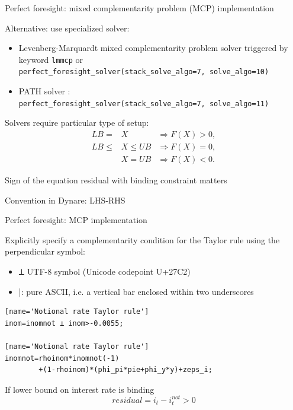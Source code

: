 \begin{frame}[fragile]{Perfect foresight: mixed complementarity problem (MCP) implementation}
\begin{wideitemize}
\item Alternative: use specialized  solver:
\begin{itemize}
\item Levenberg-Marquardt mixed complementarity problem solver \parencite{KanzowPetra2004} triggered by keyword \texttt{lmmcp} or\\
     \texttt{perfect\_foresight\_solver(stack\_solve\_algo=7, solve\_algo=10)}
\item PATH solver \parencite{FerrisMunson1999}: \\ \texttt{perfect\_foresight\_solver(stack\_solve\_algo=7, solve\_algo=11)}
\end{itemize}
\item Solvers require particular type of setup:
\begin{align}
        LB =&X  &\Rightarrow   F(X)>0,\\
       LB\leq &X \leq UB &\Rightarrow   F(X)=0,\\
        &X =UB &\Rightarrow   F(X)<0.
\end{align}
\item Sign of the equation residual with binding constraint matters
\item Convention in Dynare: LHS-RHS
\end{wideitemize}
\end{frame}

\begin{frame}[fragile]{Perfect foresight: MCP implementation}
\begin{wideitemize}
\item Explicitly specify a complementarity condition for the Taylor rule using the perpendicular symbol:
\begin{itemize}
        \item  ⟂ UTF-8 symbol (Unicode codepoint U+27C2)
        \item  \textunderscore|\textunderscore : pure ASCII, i.e. a vertical bar enclosed within two underscores
\end{itemize}
\begin{verbatim}
[name='Notional rate Taylor rule'] 
inom=inomnot ⟂ inom>-0.0055;

[name='Notional rate Taylor rule']
inomnot=rhoinom*inomnot(-1)
        +(1-rhoinom)*(phi_pi*pie+phi_y*y)+zeps_i;
\end{verbatim}
\item If lower bound on interest rate is binding
\begin{equation}
  residual=i_t-i_t^{not}>0
\end{equation}

\end{wideitemize}
\end{frame}

